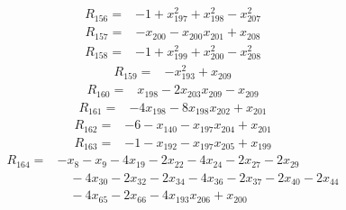 \begin{equation*}\begin{split}
R_{156}={}&-1 + x_{197}^{2} + x_{198}^{2} - x_{207}^{2}
\end{split}\end{equation*}
\begin{equation*}\begin{split}
R_{157}={}&-x_{200} - x_{200} x_{201} + x_{208}
\end{split}\end{equation*}
\begin{equation*}\begin{split}
R_{158}={}&-1 + x_{199}^{2} + x_{200}^{2} - x_{208}^{2}
\end{split}\end{equation*}
\begin{equation*}\begin{split}
R_{159}={}&-x_{193}^{2} + x_{209}
\end{split}\end{equation*}
\begin{equation*}\begin{split}
R_{160}={}&x_{198} - 2x_{203} x_{209} - x_{209}
\end{split}\end{equation*}
\begin{equation*}\begin{split}
R_{161}={}&-4x_{198} - 8x_{198} x_{202} + x_{201}
\end{split}\end{equation*}
\begin{equation*}\begin{split}
R_{162}={}&-6 - x_{140} - x_{197} x_{204} + x_{201}
\end{split}\end{equation*}
\begin{equation*}\begin{split}
R_{163}={}&-1 - x_{192} - x_{197} x_{205} + x_{199}
\end{split}\end{equation*}
\begin{equation*}\begin{split}
R_{164}={}&-x_{8} - x_{9} - 4x_{19} - 2x_{22} - 4x_{24} - 2x_{27} - 2x_{29}\\
&\quad -4x_{30} - 2x_{32} - 2x_{34} - 4x_{36} - 2x_{37} - 2x_{40} - 2x_{44}\\
&\quad -4x_{65} - 2x_{66} - 4x_{193} x_{206} + x_{200}
\end{split}\end{equation*}
